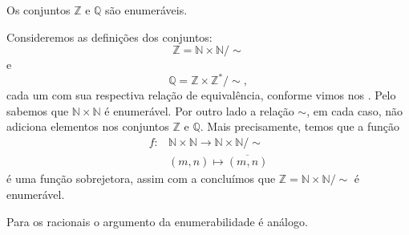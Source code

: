 \documentclass[../main.tex]{subfiles}
\begin{document}
\begin{corol}
    Os conjuntos $\mathbb{Z}$ e $\mathbb{Q}$ são enumeráveis.
\end{corol}
\begin{dem}
    Consideremos as definições dos conjuntos:
    \[ \mathbb{Z} = \mathbb{N} \times \mathbb{N}/\sim \]
    e
    \[ \mathbb{Q} = \mathbb{Z} \times \mathbb{Z}^*/\sim, \]
    cada um com sua respectiva relação de equivalência, conforme vimos nos .
    Pelo  sabemos que $\mathbb{N} \times \mathbb{N}$ é enumerável. Por outro lado a relação $\sim$, em cada caso, não adiciona elementos nos conjuntos $\mathbb{Z}$ e $\mathbb{Q}$. Mais precisamente, temos que a função
    \begin{align*}
        f \colon &\mathbb{N} \times \mathbb{N} \to \mathbb{N} \times \mathbb{N} / \sim \\
                & (m,n) \mapsto \overline{(m,n)}
    \end{align*}
    é uma função sobrejetora, assim com a  concluímos que $\mathbb{Z} = \mathbb{N} \times \mathbb{N} / \sim$ é enumerável.

    Para os racionais o argumento da enumerabilidade é análogo.
\end{dem}
\end{document}
